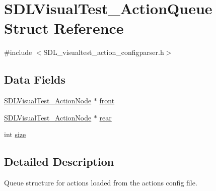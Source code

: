 \hypertarget{struct_s_d_l_visual_test___action_queue}{\section{S\-D\-L\-Visual\-Test\-\_\-\-Action\-Queue Struct Reference}
\label{struct_s_d_l_visual_test___action_queue}
}


{\ttfamily \#include $<$S\-D\-L\-\_\-visualtest\-\_\-action\-\_\-configparser.\-h$>$}

\subsection*{Data Fields}
\begin{DoxyCompactItemize}
\item 
\hyperlink{struct_s_d_l_visual_test___action_node}{S\-D\-L\-Visual\-Test\-\_\-\-Action\-Node} $\ast$ \hyperlink{struct_s_d_l_visual_test___action_queue_a8b810b2fd2b05698be642ee08836a452}{front}
\item 
\hyperlink{struct_s_d_l_visual_test___action_node}{S\-D\-L\-Visual\-Test\-\_\-\-Action\-Node} $\ast$ \hyperlink{struct_s_d_l_visual_test___action_queue_a4aaf4563956932c81c65d05f9020f2ce}{rear}
\item 
int \hyperlink{struct_s_d_l_visual_test___action_queue_a439227feff9d7f55384e8780cfc2eb82}{size}
\end{DoxyCompactItemize}


\subsection{Detailed Description}
Queue structure for actions loaded from the actions config file. 

